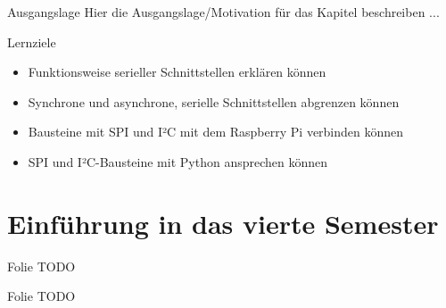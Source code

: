 \begin{frame}{Ausgangslage}
    Hier die Ausgangslage/Motivation für das Kapitel beschreiben ...

\end{frame}

\begin{frame}{Lernziele}
    \begin{itemize}
        \item Funktionsweise serieller Schnittstellen erklären können
        \item Synchrone und asynchrone, serielle Schnittstellen abgrenzen können
        \item Bausteine mit SPI und I²C mit dem Raspberry Pi verbinden können
        \item SPI und I²C-Bausteine mit Python ansprechen können
    \end{itemize}
\end{frame}


\section{Einführung in das vierte Semester}

\begin{frame}{Folie}
    TODO
\end{frame}

\begin{frame}{Folie}
    TODO
\end{frame}

